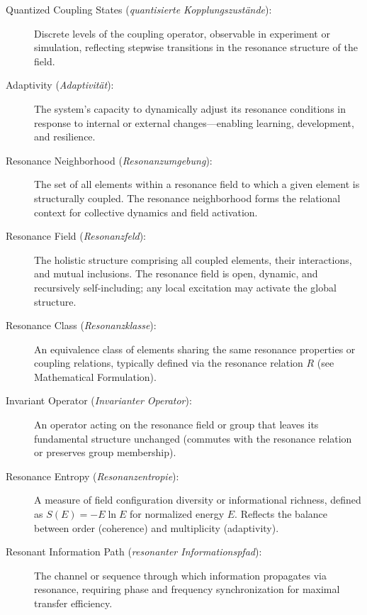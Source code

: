 \documentclass[12pt]{article}
\begin{document}
\begin{description}
	\item[Quantized Coupling States (\textit{quantisierte Kopplungszustände}):]  
	Discrete levels of the coupling operator, observable in experiment or simulation, reflecting stepwise transitions in the resonance structure of the field.
	
	\item[Adaptivity (\textit{Adaptivität}):]  
	The system’s capacity to dynamically adjust its resonance conditions in response to internal or external changes—enabling learning, development, and resilience.
	
	\item[Resonance Neighborhood (\textit{Resonanzumgebung}):]  
	The set of all elements within a resonance field to which a given element is structurally coupled. The resonance neighborhood forms the relational context for collective dynamics and field activation.
	
	\item[Resonance Field (\textit{Resonanzfeld}):]  
	The holistic structure comprising all coupled elements, their interactions, and mutual inclusions. The resonance field is open, dynamic, and recursively self-including; any local excitation may activate the global structure.
	
	\item[Resonance Class (\textit{Resonanzklasse}):]  
	An equivalence class of elements sharing the same resonance properties or coupling relations, typically defined via the resonance relation $R$ (see Mathematical Formulation).
	
	\item[Invariant Operator (\textit{Invarianter Operator}):]  
	An operator acting on the resonance field or group that leaves its fundamental structure unchanged (commutes with the resonance relation or preserves group membership).
	
	\item[Resonance Entropy (\textit{Resonanzentropie}):]  
	A measure of field configuration diversity or informational richness, defined as $S(E) = -E \ln E$ for normalized energy $E$. Reflects the balance between order (coherence) and multiplicity (adaptivity).
	
	\item[Resonant Information Path (\textit{resonanter Informationspfad}):]  
	The channel or sequence through which information propagates via resonance, requiring phase and frequency synchronization for maximal transfer efficiency.
	
\end{description}
\end{document}
